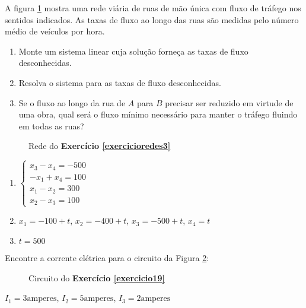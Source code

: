 \documentclass[12pt]{exam}
\begin{document}
\begin{exercicio}\label{exercicioredes3}
  A figura \ref{exercicio3redesanton} mostra uma rede viária de ruas de mão única com fluxo de tráfego nos sentidos indicados. As taxas
  de fluxo ao longo das ruas são medidas pelo número médio de veículos por hora.
  \begin{enumerate}
    \item Monte um sistema linear cuja solução forneça as taxas de fluxo desconhecidas.
    \item Resolva o sistema para as taxas de fluxo desconhecidas.
    \item Se o fluxo ao longo da rua de $A$ para $B$ precisar ser reduzido em virtude de uma obra, qual será o fluxo mínimo necessário para manter o tráfego fluindo em todas as ruas?
  \end{enumerate}
  \begin{figure}[!h]
    \centering
    
    \caption{Rede do \textbf{Exercício \ref{exercicioredes3}}}
    \label{exercicio3redesanton}
  \end{figure}
  \begin{solucao}
    \begin{enumerate}
      \item $\begin{cases}x_3 - x_4 = -500\\-x_1 + x_4 = 100\\x_1 - x_2 = 300\\x_2 - x_3 = 100\end{cases}$
      \item $x_1 = -100 +t$, $x_2 = -400 + t$, $x_3 = -500 + t$, $x_4 = t$
      \item $t = 500$
    \end{enumerate}
  \end{solucao}
\end{exercicio}

\newpage

\begin{exercicio}\label{exercicio19}
  Encontre a corrente elétrica para o circuito da Figura \ref{exercicio19circuitopoole}:
    \begin{figure}[!h]
      \centering
      
      \caption{Circuito do \textbf{Exercício \ref{exercicio19}}}
    \label{exercicio19circuitopoole}
    \end{figure}

  \begin{solucao}
    $I_1 = 3 \mbox{amperes}$,
    $I_2 = 5 \mbox{amperes}$,
    $I_3 = 2 \mbox{amperes}$
  \end{solucao}
\end{exercicio}
\end{document}
